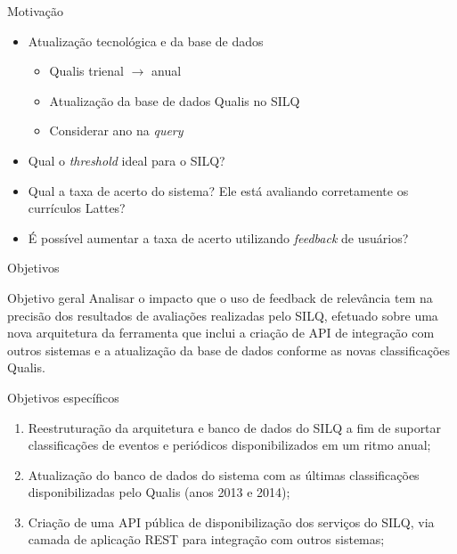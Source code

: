\documentclass{beamer}
\begin{document}
\begin{frame}{Motivação}
  \begin{itemize}
    \item Atualização tecnológica e da base de dados
    \begin{itemize}
      \item Qualis trienal $\rightarrow$ anual
      \item Atualização da base de dados Qualis no SILQ
      \item Considerar ano na \textit{query}
    \end{itemize}

    \item Qual o \textit{threshold} ideal para o SILQ?
    \item Qual a taxa de acerto do sistema? Ele está avaliando corretamente os currículos Lattes?
    \item É possível aumentar a taxa de acerto utilizando \textit{feedback} de usuários?
  \end{itemize}
\end{frame}

\begin{frame}{Objetivos}
  \begin{block}{Objetivo geral}
    Analisar o impacto que o uso de feedback de relevância tem na precisão dos resultados de avaliações realizadas pelo SILQ, efetuado sobre uma nova arquitetura da ferramenta que inclui a criação de API de integração com outros sistemas e a atualização da base de dados conforme as novas classificações Qualis.
  \end{block}
\end{frame}

\begin{frame}{Objetivos específicos}
  \begin{enumerate}
    \item<1-> Reestruturação da arquitetura e banco de dados do SILQ a fim de suportar classificações de eventos e periódicos disponibilizados em um ritmo anual;

    \item<1-> Atualização do banco de dados do sistema com as últimas classificações disponibilizadas pelo Qualis (anos 2013 e 2014);

    \item<2-> Criação de uma API pública de disponibilização dos serviços do SILQ, via camada de aplicação REST para integração com outros sistemas;
  \end{enumerate}
\end{frame}
\end{document}
